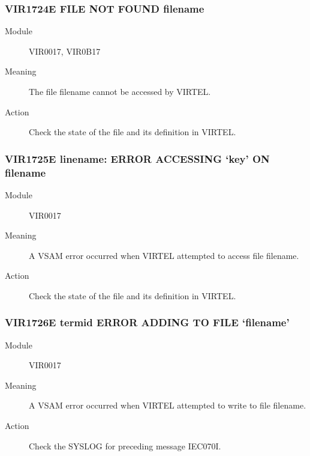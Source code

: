 \documentclass[letterpaper,10pt,english]{sphinxmanual}
\begin{document}
\subsubsection{VIR1724E FILE NOT FOUND filename}
\label{\detokenize{messages:vir1724e-file-not-found-filename}}\begin{description}
\item[{Module}] \leavevmode
VIR0017, VIR0B17

\item[{Meaning}] \leavevmode
The file filename cannot be accessed by VIRTEL.

\item[{Action}] \leavevmode
Check the state of the file and its definition in VIRTEL.

\end{description}


\subsubsection{VIR1725E linename: ERROR ACCESSING ‘key’ ON filename}
\label{\detokenize{messages:vir1725e-linename-error-accessing-key-on-filename}}\begin{description}
\item[{Module}] \leavevmode
VIR0017

\item[{Meaning}] \leavevmode
A VSAM error occurred when VIRTEL attempted to access file filename.

\item[{Action}] \leavevmode
Check the state of the file and its definition in VIRTEL.

\end{description}


\subsubsection{VIR1726E termid ERROR ADDING TO FILE ‘filename’}
\label{\detokenize{messages:vir1726e-termid-error-adding-to-file-filename}}\begin{description}
\item[{Module}] \leavevmode
VIR0017

\item[{Meaning}] \leavevmode
A VSAM error occurred when VIRTEL attempted to write to file filename.

\item[{Action}] \leavevmode
Check the SYSLOG for preceding message IEC070I.

\end{description}
\end{document}
